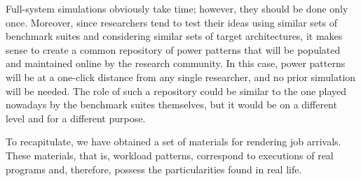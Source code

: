 Full-system simulations obviously take time; however, they should be done only
once. Moreover, since researchers tend to test their ideas using similar sets of
benchmark suites and considering similar sets of target architectures, it makes
sense to create a common repository of power patterns that will be populated and
maintained online by the research community. In this case, power patterns will
be at a one-click distance from any single researcher, and no prior simulation
will be needed. The role of such a repository could be similar to the one played
nowadays by the benchmark suites themselves, but it would be on a different
level and for a different purpose.

To recapitulate, we have obtained a set of materials for rendering job arrivals.
These materials, that is, workload patterns, correspond to executions of real
programs and, therefore, possess the particularities found in real life.
